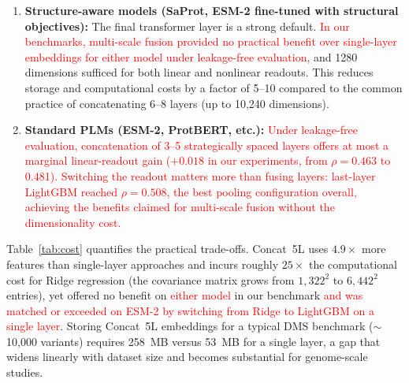 \documentclass[numbered,webpdf,modern,large]{oup-authoring-template}
\newcommand{\rev}[1]{\textcolor{red}{#1}}
\begin{document}
\begin{enumerate}
    \item \textbf{Structure-aware models (SaProt, ESM-2 fine-tuned with structural
    objectives):} The final transformer layer is a strong default. \rev{In our
    benchmarks, multi-scale fusion provided no practical benefit over single-layer
    embeddings for either model under leakage-free evaluation}, and 1280 dimensions
    sufficed for both linear and nonlinear readouts.
    This reduces
    storage and computational costs by a factor of 5--10 compared to the common
    practice of concatenating 6--8 layers (up to 10,240 dimensions).

    \item \textbf{Standard PLMs (ESM-2, ProtBERT, etc.):} \rev{Under leakage-free
    evaluation, concatenation of 3--5 strategically spaced layers offers at most a
    marginal linear-readout gain ($+0.018$ in our experiments, from $\rho = 0.463$
    to 0.481). Switching the readout matters more than fusing layers: last-layer
    LightGBM reached $\rho = 0.508$, the best pooling configuration overall,
    achieving the benefits claimed for multi-scale fusion without the dimensionality
    cost.}
\end{enumerate}

Table~\ref{tab:cost} quantifies the practical trade-offs. Concat~5L uses
$4.9\times$ more features than single-layer approaches and incurs roughly
$25\times$ the computational cost for Ridge regression (the covariance matrix
grows from $1{,}322^2$ to $6{,}442^2$ entries), yet offered no benefit on
\rev{either model} in our benchmark \rev{and was matched or exceeded on
ESM-2 by switching from Ridge to LightGBM on a single layer}. Storing Concat~5L embeddings for a typical DMS
benchmark ($\sim$10,000 variants) requires 258~MB versus 53~MB for a single
layer, a gap that widens linearly with dataset size and becomes substantial
for genome-scale studies.
\end{document}
